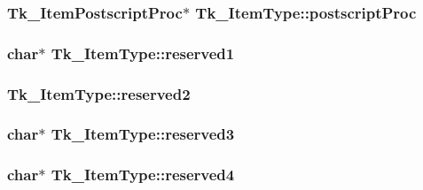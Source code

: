 \subsubsection[{\texorpdfstring{postscript\+Proc}{postscriptProc}}]{\setlength{\rightskip}{0pt plus 5cm}Tk\+\_\+\+Item\+Postscript\+Proc$\ast$ Tk\+\_\+\+Item\+Type\+::postscript\+Proc}\hypertarget{struct_tk___item_type_afc66dbfd50afc93a61a097ff1b942530}{}\label{struct_tk___item_type_afc66dbfd50afc93a61a097ff1b942530}
\subsubsection[{\texorpdfstring{reserved1}{reserved1}}]{\setlength{\rightskip}{0pt plus 5cm}char$\ast$ Tk\+\_\+\+Item\+Type\+::reserved1}\hypertarget{struct_tk___item_type_afa36a3c3c1e14b426482d6f07d05fe7f}{}\label{struct_tk___item_type_afa36a3c3c1e14b426482d6f07d05fe7f}
\subsubsection[{\texorpdfstring{reserved2}{reserved2}}]{ Tk\+\_\+\+Item\+Type\+::reserved2}\hypertarget{struct_tk___item_type_a360bb68ffba4fec3daee44194fd48ede}{}\label{struct_tk___item_type_a360bb68ffba4fec3daee44194fd48ede}
\subsubsection[{\texorpdfstring{reserved3}{reserved3}}]{\setlength{\rightskip}{0pt plus 5cm}char$\ast$ Tk\+\_\+\+Item\+Type\+::reserved3}\hypertarget{struct_tk___item_type_ac1941c0ea1d2657068c60dcb7fa71d35}{}\label{struct_tk___item_type_ac1941c0ea1d2657068c60dcb7fa71d35}
\subsubsection[{\texorpdfstring{reserved4}{reserved4}}]{\setlength{\rightskip}{0pt plus 5cm}char$\ast$ Tk\+\_\+\+Item\+Type\+::reserved4}\hypertarget{struct_tk___item_type_a45856e8d3d31e75f8e3f9fd8d18f1871}{}\label{struct_tk___item_type_a45856e8d3d31e75f8e3f9fd8d18f1871}
